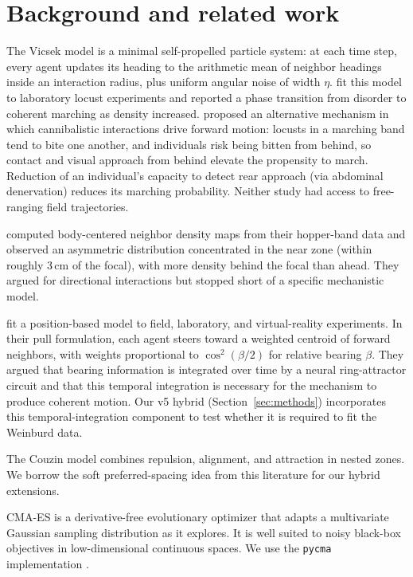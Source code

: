 \documentclass[11pt]{article}
\begin{document}
\section{Background and related work}

The Vicsek model \citep{vicsek1995} is a minimal self-propelled particle
system: at each time step, every agent updates its heading to the
arithmetic mean of neighbor headings inside an interaction radius, plus
uniform angular noise of width $\eta$. \citet{buhl2006} fit this model to
laboratory locust experiments and reported a phase transition from
disorder to coherent marching as density increased. \citet{bazazi2008}
proposed an alternative mechanism in which cannibalistic interactions
drive forward motion: locusts in a marching band tend to bite one
another, and individuals risk being bitten from behind, so contact and
visual approach from behind elevate the propensity to march. Reduction
of an individual's capacity to detect rear approach (via abdominal
denervation) reduces its marching probability. Neither study had access
to free-ranging field trajectories.

\citet{weinburd2024} computed body-centered neighbor density maps from
their hopper-band data and observed an asymmetric distribution
concentrated in the near zone (within roughly 3\,cm of the focal), with
more density behind the focal than ahead. They argued for directional
interactions but stopped short of a specific mechanistic model.

\citet{sayin2025} fit a position-based model to field, laboratory, and
virtual-reality experiments. In their pull formulation, each agent steers
toward a weighted centroid of forward neighbors, with weights proportional
to $\cos^2(\beta/2)$ for relative bearing $\beta$. They argued that
bearing information is integrated over time by a neural ring-attractor
circuit and that this temporal integration is necessary for the mechanism
to produce coherent motion. Our v5 hybrid (Section~\ref{sec:methods})
incorporates this temporal-integration component to test whether it is
required to fit the Weinburd data.

The Couzin model \citep{couzin2002} combines repulsion, alignment, and
attraction in nested zones. We borrow the soft preferred-spacing idea
from this literature for our hybrid extensions.

CMA-ES \citep{hansen2016} is a derivative-free evolutionary optimizer
that adapts a multivariate Gaussian sampling distribution as it explores.
It is well suited to noisy black-box objectives in low-dimensional
continuous spaces. We use the \texttt{pycma} implementation
\citep{pycma}.
\end{document}
